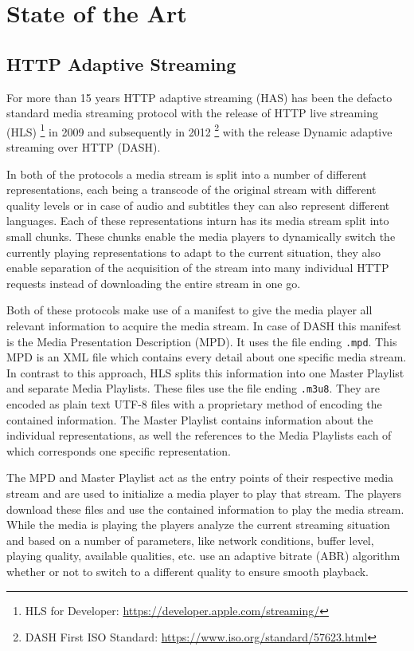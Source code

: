 \chapter{State of the Art\label{cha:chapter2}}

\section{HTTP Adaptive Streaming\label{sec:live}}

For more than 15 years HTTP adaptive streaming (HAS) has been the defacto standard media streaming protocol with the release of HTTP live streaming (HLS) \footnote{HLS for Developer: \url{https://developer.apple.com/streaming/}} in 2009 \cite{rfc8216} and subsequently in 2012 \footnote{DASH First ISO Standard: \url{https://www.iso.org/standard/57623.html}} with the release Dynamic adaptive streaming over HTTP (DASH).

In both of the protocols a media stream is split into a number of different representations, each being a transcode of the original stream with different quality levels or in case of audio and subtitles they can also represent different languages. Each of these representations inturn has its media stream split into small chunks. These chunks enable the media players to dynamically switch the currently playing representations to adapt to the current situation, they also enable separation of the acquisition of the stream into many individual HTTP requests instead of downloading the entire stream in one go.

Both of these protocols make use of a manifest to give the media player all relevant information to acquire the media stream. In case of DASH this manifest is the Media Presentation Description (MPD). It uses the file ending \texttt{.mpd}. This MPD is an XML \cite{rfc5364} file which contains every detail about one specific media stream. In contrast to this approach, HLS splits this information into one Master Playlist and separate Media Playlists. These files use the file ending \texttt{.m3u8}. They are encoded as plain text UTF-8 \cite{rfc3629} files with a proprietary method of encoding the contained information. The Master Playlist contains information about the individual representations, as well the references to the Media Playlists each of which corresponds one specific representation. 

The MPD and Master Playlist act as the entry points of their respective media stream and are used to initialize a media player to play that stream. The players download these files and use the contained information to play the media stream. While the media is playing the players analyze the current streaming situation and based on a number of parameters, like network conditions, buffer level, playing quality, available qualities, etc. use an adaptive bitrate (ABR) algorithm whether or not to switch to a different quality to ensure smooth playback.

